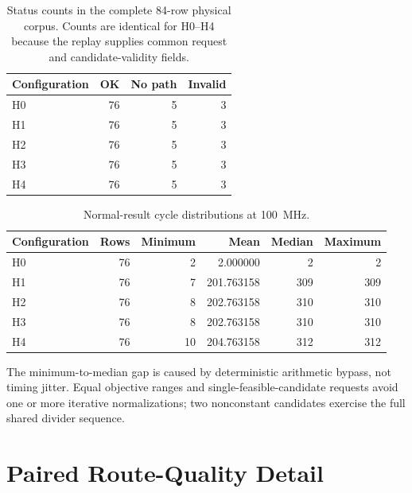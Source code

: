 \begin{table}[H]
\centering
\caption{Status counts in the complete 84-row physical corpus. Counts are identical
for H0--H4 because the replay supplies common request and candidate-validity fields.}
\label{tab:full-status-counts}
\begin{tabular}{@{}lrrr@{}}
\toprule
\textbf{Configuration} & \textbf{OK} & \textbf{No path} & \textbf{Invalid}\\
\midrule
H0 & 76 & 5 & 3\\
H1 & 76 & 5 & 3\\
H2 & 76 & 5 & 3\\
H3 & 76 & 5 & 3\\
H4 & 76 & 5 & 3\\
\bottomrule
\end{tabular}
\end{table}

\begin{table}[H]
\centering
\caption{Normal-result cycle distributions at 100~MHz.}
\label{tab:full-cycle-distribution}
\begin{tabular}{@{}lrrrrr@{}}
\toprule
\textbf{Configuration} & \textbf{Rows} & \textbf{Minimum} & \textbf{Mean} &
\textbf{Median} & \textbf{Maximum}\\
\midrule
H0 & 76 & 2 & 2.000000 & 2 & 2\\
H1 & 76 & 7 & 201.763158 & 309 & 309\\
H2 & 76 & 8 & 202.763158 & 310 & 310\\
H3 & 76 & 8 & 202.763158 & 310 & 310\\
H4 & 76 & 10 & 204.763158 & 312 & 312\\
\bottomrule
\end{tabular}
\end{table}

The minimum-to-median gap is caused by deterministic arithmetic bypass, not timing
jitter. Equal objective ranges and single-feasible-candidate requests avoid one or
more iterative normalizations; two nonconstant candidates exercise the full shared
divider sequence.

\section{Paired Route-Quality Detail}

\begin{table}[H]
\centering
\small
\caption{Detailed jointly successful physical comparisons. Difference is first
configuration minus second in UNORM16 units.}
\label{tab:pairwise-quality-detail}
\end{table}

